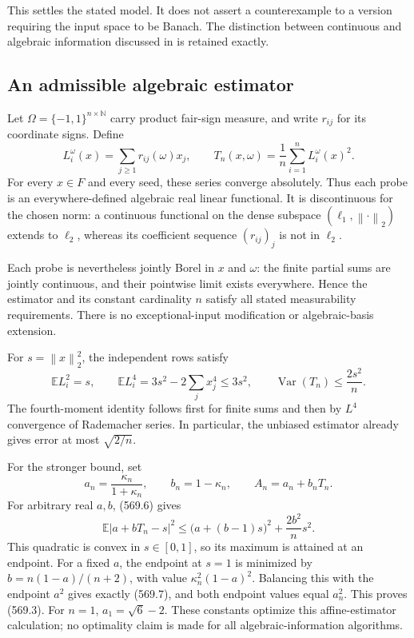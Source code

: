 \documentclass[11pt,a4paper]{article}
\newcommand{\N}{\mathbb N}
\newcommand{\E}{\mathbb E}
\newcommand{\norm}[1]{\left\lVert#1\right\rVert}
\newcommand{\abs}[1]{\left\lvert#1\right\rvert}
\theoremstyle{definition}
\theoremstyle{remark}
\numberwithin{equation}{section}
\begin{document}
This settles the stated model. It does not assert a counterexample to
a version requiring the input space to be Banach. The distinction
between continuous and algebraic information discussed in
\cite{hnw2011} is retained exactly.

\subsection{An admissible algebraic estimator}

Let \(\Omega=\{-1,1\}^{n\times\N}\) carry product fair-sign measure, and
write \(r_{ij}\) for its coordinate signs. Define
\[
 L_i^\omega(x)=\sum_{j\ge1}r_{ij}(\omega)x_j,\qquad
 T_n(x,\omega)=\frac1n\sum_{i=1}^nL_i^\omega(x)^2 .
 \tag{569.5}
\]
For every \(x\in F\) and every seed, these series converge absolutely.
Thus each probe is an everywhere-defined algebraic real linear
functional. It is discontinuous for the chosen norm: a continuous
functional on the dense subspace \((\ell_1,\norm{\cdot}_2)\) extends
to \(\ell_2\), whereas its coefficient sequence
\((r_{ij})_j\) is not in \(\ell_2\).

Each probe is nevertheless jointly Borel in \(x\) and \(\omega\):
the finite partial sums are jointly continuous, and their pointwise
limit exists everywhere. Hence the estimator and its constant
cardinality \(n\) satisfy all stated measurability requirements.
There is no exceptional-input modification or algebraic-basis
extension.

For \(s=\norm x_2^2\), the independent rows satisfy
\[
 \E L_i^2=s,\qquad
 \E L_i^4=3s^2-2\sum_jx_j^4\le3s^2,\qquad
 \operatorname{Var}(T_n)\le \frac{2s^2}{n}.
 \tag{569.6}
\]
The fourth-moment identity follows first for finite sums and then by
\(L^4\) convergence of Rademacher series. In particular, the unbiased
estimator already gives error at most \(\sqrt{2/n}\).

For the stronger bound, set
\[
 a_n=\frac{\kappa_n}{1+\kappa_n},\qquad
 b_n=1-\kappa_n,\qquad A_n=a_n+b_nT_n .
 \tag{569.7}
\]
For arbitrary real \(a,b\), (569.6) gives
\[
 \E\abs{a+bT_n-s}^2
       \le \bigl(a+(b-1)s\bigr)^2+\frac{2b^2}{n}s^2 .
 \tag{569.8}
\]
This quadratic is convex in \(s\in[0,1]\), so its maximum is attained
at an endpoint. For a fixed \(a\), the endpoint at \(s=1\) is minimized
by \(b=n(1-a)/(n+2)\), with value
\(\kappa_n^2(1-a)^2\). Balancing this with the endpoint \(a^2\)
gives exactly (569.7), and both endpoint values equal \(a_n^2\).
This proves (569.3). For \(n=1\), \(a_1=\sqrt6-2\).
These constants optimize this affine-estimator calculation; no
optimality claim is made for all algebraic-information algorithms.
\end{document}
